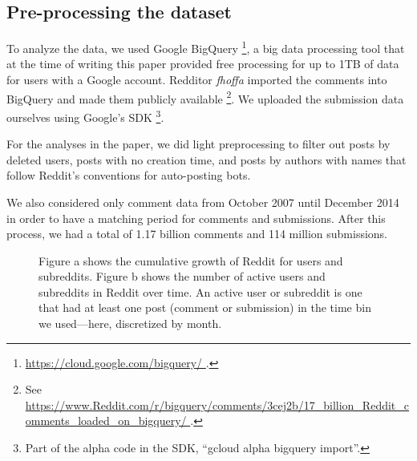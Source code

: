 \subsection{Pre-processing the dataset}

To analyze the data, we used Google BigQuery \footnote{\url{https://cloud.google.com/bigquery/ }.}, a big data processing tool that at the time of writing this paper provided free processing for up to 1TB of data for users with a Google account.  Redditor \textit{fhoffa} imported the comments into BigQuery and made them publicly available \footnote{See \url{https://www.Reddit.com/r/bigquery/comments/3cej2b/17_billion_Reddit_comments_loaded_on_bigquery/ }.}.  We uploaded the submission data ourselves using Google's SDK \footnote{Part of the alpha code in the SDK, ``gcloud alpha bigquery import''.}.

For the analyses in the paper, we did light preprocessing to filter out posts by deleted users, posts with no creation time, and posts by authors with names that follow Reddit's conventions for auto-posting bots. 

%

We also considered only comment data from October 2007 until December 2014 in order to have a matching period for comments and submissions. After this process, we had a total of 1.17 billion comments and 114 million submissions.

\begin{figure*}[!tb]
\centering
{}
\caption{Figure a shows the cumulative growth of Reddit for users and subreddits. Figure b shows the number of active users and subreddits in Reddit over time. An active user or subreddit is one that had at least one post (comment or submission) in the time bin we used---here, discretized by month.}
\label{fig:cumulative}
\end{figure*}

